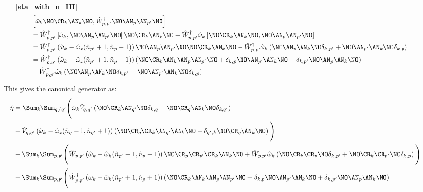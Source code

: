 \begin{appendix}
\begin{itemize}
\begin{align}
\end{align}
\item[\textbf{\ref{eta_with_n_III}}] 
\begin{align}
&\left[ \hat\omega_k \NO\CR_k\AN_k\NO,\hat W_{p,p^\prime}^\dagger\NO\AN_p\AN_{p^\prime} \NO \right]\nonumber \\
&=\hat W_{p,p^\prime}^\dagger \left[ \hat\omega_k ,\NO\AN_p\AN_{p^\prime} \NO \right]\NO\CR_k\AN_k\NO+\hat W_{p,p^\prime}^\dagger \hat\omega_k\left[  \NO\CR_k\AN_k\NO,\NO\AN_p\AN_{p^\prime} \NO \right] \nonumber \\
&=\hat W_{p,p^\prime}^\dagger \left(\hat\omega_k-\hat\omega_k(\hat n_{p^\prime}+1,\hat n_p +1)\right)\NO \AN_p\AN_{p^\prime}\NO\NO\CR_k\AN_k\NO-\hat W_{p,p^\prime}^\dagger \hat\omega_k\left(\NO\AN_p\AN_k\NO\delta_{k,p^\prime}+\NO\AN_{p^\prime}\AN_k\NO\delta_{k,p}\right) \nonumber \\
&=\hat W_{p,p^\prime}^\dagger \left(\hat\omega_k-\hat\omega_k(\hat n_{p^\prime}+1,\hat n_p +1)\right)\left(\NO \CR_k\AN_k\AN_p\AN_{p^\prime}\NO+\delta_{k,p}\NO\AN_{p^\prime}\AN_k\NO+\delta_{k,p^\prime}\NO\AN_p\AN_k\NO\right) \nonumber \\
&-\hat W_{p,p^\prime}^\dagger \hat\omega_k\left(\NO\AN_p\AN_k\NO\delta_{k,p^\prime}+\NO\AN_{p^\prime}\AN_k\NO\delta_{k,p}\right)
\end{align}
\end{itemize}
This gives the canonical generator as:
\begin{align}
\hat\eta &= \Sum_k \Sum_{q\neq q^\prime}\Bigg(\hat\omega_k \hat V_{q,q^\prime} \left(\NO\CR_k\AN_{q^\prime}\NO\delta_{k,q}-\NO\CR_q\AN_k\NO\delta_{k,q^\prime}\right) \nonumber \\
& + \hat V_{q,q^\prime} \left(\hat\omega_k - \hat\omega_k(\hat n_q-1,\hat n_{q^\prime}+1)\right) \left(\NO \CR_q\CR_k\AN_{q^\prime}\AN_k\NO+\delta_{q^\prime,k}\NO\CR_{q}\AN_k\NO\right)\Bigg)\nonumber\\ \quad& 
+ \Sum_k\Sum_{p,p^\prime}\Bigg(\hat W_{p,p^\prime} \left(\hat\omega_k-\hat\omega_k(\hat n_{p^\prime}-1,\hat n_p -1)\right)\NO \CR_p\CR_{p^\prime}\CR_k\AN_k\NO + \hat W_{p,p^\prime}\hat\omega_k \left(\NO\CR_k\CR_p\NO\delta_{k,p^\prime}+\NO\CR_k\CR_{p^\prime}\NO\delta_{k,p}\right)\Bigg)\nonumber\\ \quad& 
+ \Sum_k\Sum_{p,p^\prime}\Bigg(\hat W_{p,p^\prime}^\dagger \left(\omega_k-\hat\omega_k(\hat n_{p^\prime}+1,\hat n_p +1)\right)\left(\NO \CR_k\AN_k\AN_p\AN_{p^\prime}\NO+\delta_{k,p}\NO\AN_{p^\prime}\AN_k\NO+\delta_{k,p^\prime}\NO\AN_p\AN_k\NO\right) \nonumber \\

\end{align}
\end{appendix}
